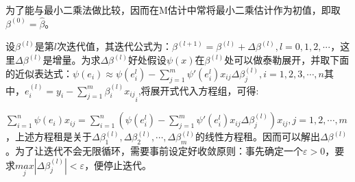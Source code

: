 \documentclass[english]{article}\usepackage[]{graphicx}\usepackage[]{color}
\begin{document}
为了能与最小二乘法做比较，因而在M估计中常将最小二乘估计作为初值，即取$\beta^{(0)}=\hat{\beta}$。

设$\beta^{(l)}$是第$l$次迭代值，其迭代公式为：$\beta^{(l+1)}=\beta^{(l)}+\Delta\beta^{(l)},l=0,1,2,\text{·}\text{·}\text{·}$，这里\foreignlanguage{english}{$\Delta\beta^{(l)}$}是增量。为求$\Delta\beta^{(l)}$好处假设$\psi(x)$在$\beta^{(l)}$处可以做泰勒展开，并取下面的近似表达式：$\psi(e_{i})\approx\psi(e_{i}^{l})-{\displaystyle \sum_{j=1}^{m}\psi'(e_{i}^{l})x_{ij}\Delta\beta_{j}^{(l)}},i=1,2,3,\cdots,n$其中，${\displaystyle e_{i}^{(l)}=y_{i}-\sum_{j=1}^{m}\beta_{i}^{(l)}x_{ij}}_{i}$,将展开式代入方程组，可得:

${\textstyle {\displaystyle \sum_{i=1}^{n}\psi(e_{i})x_{ij}}}={\textstyle {\displaystyle \sum_{i=1}^{n}(\psi(e_{i}^{l})-{\displaystyle \sum_{j=1}^{m}\psi'(e_{i}^{l})x_{ij}\Delta\beta_{j}^{(l)}})x_{ij}}},j=1,2,\cdots,m$，上述方程租是关于$\Delta\beta_{1}^{(l)},\Delta\beta_{2}^{(l)},\cdots,\Delta\beta_{m}^{(l)}$的线性方程租。因而可以解出\foreignlanguage{english}{$\Delta\beta^{(l)}$}。为了让迭代不会无限循环，需要事前设定好收敛原则：事先确定一个$\varepsilon>0$，要求$\underset{j}{max}|\Delta\beta_{j}^{(l)}|<\varepsilon$，便停止迭代。
\end{document}
